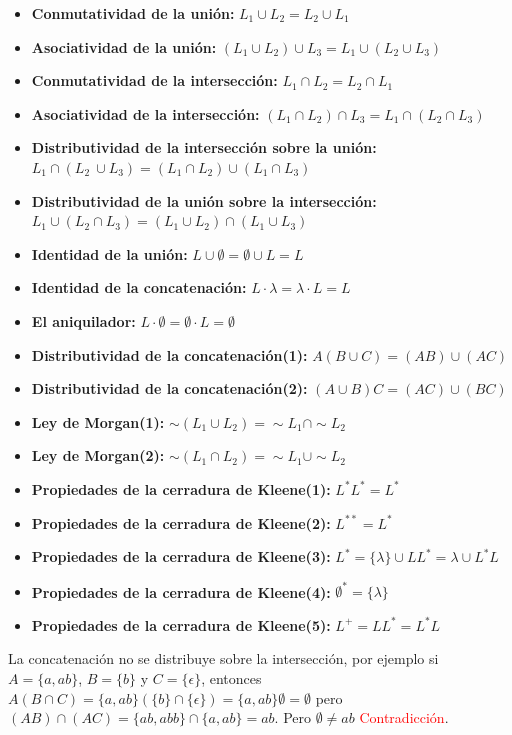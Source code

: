 \begin{itemize}
    \item \textbf{Conmutatividad de la unión:} $L_1 \cup L_2 = L_2 \cup L_1$
    \item \textbf{Asociatividad de la unión:} $(L_1 \cup L_2) \cup L_3 = L_1 \cup (L_2 \cup L_3)$
    \item \textbf{Conmutatividad de la intersección:} $L_1 \cap L_2 = L_2 \cap L_1$
    \item \textbf{Asociatividad de la intersección:} $(L_1 \cap L_2) \cap L_3 = L_1 \cap (L_2 \cap L_3)$
    \item \textbf{Distributividad de la intersección sobre la unión:} $L_1 \cap (L_2\ \cup L_3) = (L_1 \cap L_2) \cup (L_1 \cap L_3)$
    \item \textbf{Distributividad de la unión sobre la intersección:} $L_1 \cup (L_2 \cap L_3) = (L_1 \cup L_2) \cap (L_1 \cup L_3)$
    \item \textbf{Identidad de la unión:} $L \cup \emptyset = \emptyset \cup L = L$
    \item \textbf{Identidad de la concatenación:} $L \cdot \lambda = \lambda \cdot L = L$
    \item \textbf{El aniquilador:} $L \cdot \emptyset = \emptyset \cdot L = \emptyset$
    \item \textbf{Distributividad de la concatenación(1):} $A(B \cup C) = (AB) \cup (AC)$
    \item \textbf{Distributividad de la concatenación(2):} $(A \cup B)C = (AC) \cup (BC)$
    \item \textbf{Ley de Morgan(1):} $\sim (L_1 \cup L_2) = \sim L_1 \cap \sim L_2$
    \item \textbf{Ley de Morgan(2):} $\sim (L_1 \cap L_2) = \sim L_1 \cup \sim L_2$
    \item \textbf{Propiedades de la cerradura de Kleene(1):} $L^*L^* = L^*$
    \item \textbf{Propiedades de la cerradura de Kleene(2):} $L^{**} = L^*$
    \item \textbf{Propiedades de la cerradura de Kleene(3):} $L^* = \{\lambda\} \cup LL^* = \lambda \cup L^*L$
    \item \textbf{Propiedades de la cerradura de Kleene(4):} $\emptyset^* = \{\lambda\}$
    \item \textbf{Propiedades de la cerradura de Kleene(5):} $L^+ = LL^* = L^*L$
\end{itemize}

    La concatenación no se distribuye sobre la intersección, por ejemplo si $A = \{a,ab\}$, $B = \{b\}$ y $C = \{\epsilon\}$, 
    entonces $A(B \cap C) = \{a,ab\}(\{b\} \cap \{\epsilon\}) = \{a,ab\}{\emptyset} = \emptyset$  pero $(AB) \cap (AC) = \{ab, abb\} \cap \{a, ab\} = ab$. Pero $\emptyset \neq ab$ \textcolor{red}{Contradicción}.